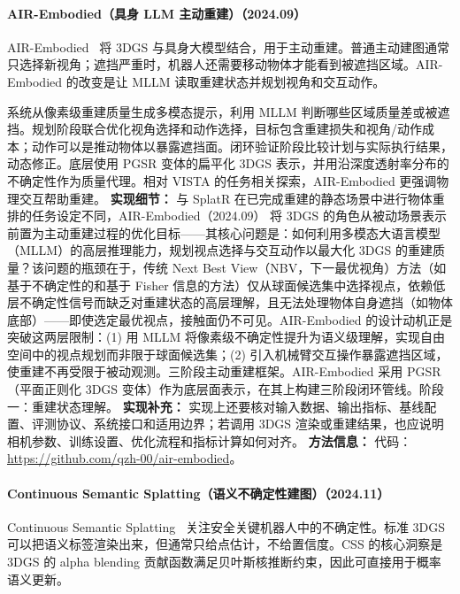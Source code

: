 \paragraph{AIR-Embodied（具身 LLM 主动重建）（2024.09）}
AIR-Embodied~\cite{2409_16019} 将 3DGS 与具身大模型结合，用于主动重建。普通主动建图通常只选择新视角；遮挡严重时，机器人还需要移动物体才能看到被遮挡区域。AIR-Embodied 的改变是让 MLLM 读取重建状态并规划视角和交互动作。

系统从像素级重建质量生成多模态提示，利用 MLLM 判断哪些区域质量差或被遮挡。规划阶段联合优化视角选择和动作选择，目标包含重建损失和视角/动作成本；动作可以是推动物体以暴露遮挡面。闭环验证阶段比较计划与实际执行结果，动态修正。底层使用 PGSR 变体的扁平化 3DGS 表示，并用沿深度透射率分布的不确定性作为质量代理。相对 VISTA 的任务相关探索，AIR-Embodied 更强调物理交互帮助重建。
\textbf{实现细节：} 与 SplatR 在已完成重建的静态场景中进行物体重排的任务设定不同，AIR-Embodied（2024.09） 将 3DGS 的角色从被动场景表示前置为主动重建过程的优化目标——其核心问题是：如何利用多模态大语言模型（MLLM）的高层推理能力，规划视点选择与交互动作以最大化 3DGS 的重建质量？该问题的瓶颈在于，传统 Next Best View（NBV，下一最优视角）方法（如基于不确定性的和基于 Fisher 信息的方法）仅从球面候选集中选择视点，依赖低层不确定性信号而缺乏对重建状态的高层理解，且无法处理物体自身遮挡（如物体底部）——即使选定最优视点，接触面仍不可见。AIR-Embodied 的设计动机正是突破这两层限制：(1) 用 MLLM 将像素级不确定性提升为语义级理解，实现自由空间中的视点规划而非限于球面候选集；(2) 引入机械臂交互操作暴露遮挡区域，使重建不再受限于被动观测。三阶段主动重建框架。AIR-Embodied 采用 PGSR（平面正则化 3DGS 变体）作为底层面表示，在其上构建三阶段闭环管线。阶段一：重建状态理解。
\textbf{实现补充：} 实现上还要核对输入数据、输出指标、基线配置、评测协议、系统接口和适用边界；若调用 3DGS 渲染或重建结果，也应说明相机参数、训练设置、优化流程和指标计算如何对齐。
\textbf{方法信息：} 代码：\url{https://github.com/qzh-00/air-embodied}。



\paragraph{Continuous Semantic Splatting（语义不确定性建图）（2024.11）}
Continuous Semantic Splatting~\cite{2411_02547} 关注安全关键机器人中的不确定性。标准 3DGS 可以把语义标签渲染出来，但通常只给点估计，不给置信度。CSS 的核心洞察是 3DGS 的 alpha blending 贡献函数满足贝叶斯核推断约束，因此可直接用于概率语义更新。

